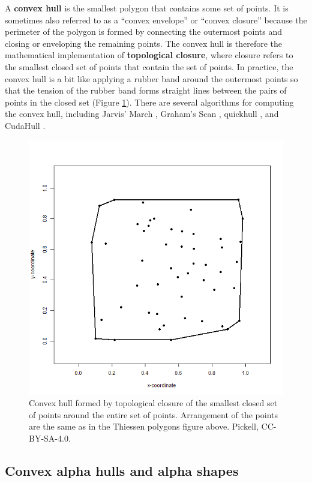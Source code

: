 \documentclass[
]{book}
\begin{document}
A \textbf{convex hull} is the smallest polygon that contains some set of points. It is sometimes also referred to as a ``convex envelope'' or ``convex closure'' because the perimeter of the polygon is formed by connecting the outermost points and closing or enveloping the remaining points. The convex hull is therefore the mathematical implementation of \textbf{topological closure}, where closure refers to the smallest closed set of points that contain the set of points. In practice, the convex hull is a bit like applying a rubber band around the outermost points so that the tension of the rubber band forms straight lines between the pairs of points in the closed set (Figure \ref{fig:7-2d-convex-hull}). There are several algorithms for computing the convex hull, including Jarvis' March \citep{jarvis_identification_1973}, Graham's Scan \citep{graham_efficient_1972}, quickhull \citep{barber_quickhull_1996}, and CudaHull \citep{stein_cudahull_2012}.

\begin{figure}
\includegraphics[width=0.75\linewidth]{images/07-2d-convex-hull} \caption{Convex hull formed by topological closure of the smallest closed set of points around the entire set of points. Arrangement of the points are the same as in the Thiessen polygons figure above. Pickell, CC-BY-SA-4.0.}\label{fig:7-2d-convex-hull}
\end{figure}

\subsection{Convex alpha hulls and alpha shapes}\label{convex-alpha-hulls-and-alpha-shapes}
\end{document}
